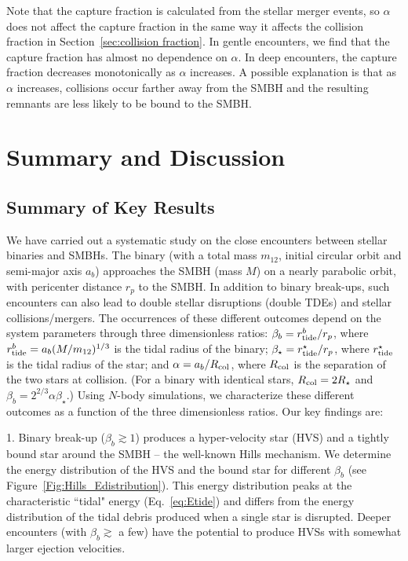 \documentclass[twocolumn]{aastex631}
\begin{document}
Note that the capture fraction is calculated from the stellar merger events, so $\alpha$ does not affect the capture fraction in the same way it affects the collision fraction in Section~\ref{sec:collision fraction}. 
In gentle encounters, we find that the capture fraction has almost no dependence on $\alpha$. 
In deep encounters, the capture fraction decreases monotonically as $\alpha$ increases. 
A possible explanation is that as $\alpha$ increases, collisions occur farther away from the SMBH and the resulting remnants are less likely to be bound to the SMBH. 


\section{Summary and Discussion}
\label{sec:application and summary}


\subsection{Summary of Key Results}
\label{sec:summary}

We have carried out a systematic study on the close encounters between stellar binaries and SMBHs. 
The binary (with a total mass $m_{12}$, initial circular orbit and semi-major axis $a_b$) approaches the SMBH (mass $M$) on a nearly parabolic orbit, with pericenter distance $r_p$ to the SMBH. 
In addition to binary break-ups, such encounters can also lead to double stellar disruptions (double TDEs) and stellar collisions/mergers. 
The occurrences of these different outcomes depend on the system parameters through three dimensionless ratios:
$\beta_b=r_{\rm tide}^b/r_p$, where $r_{\rm tide}^b=a_b(M/m_{12})^{1/3}$ is the tidal radius of the binary; 
$\beta_\star=r_{\rm tide}^\star/r_p$, where $r_{\rm tide}^\star$ is the tidal radius of the star; 
and $\alpha=a_b/R_{\rm col}$, where $R_{\rm col}$ is the separation of the two stars at collision.
(For a binary with identical stars, $R_{\rm col}=2R_\star$ and $\beta_b=2^{2/3}\alpha \beta_\star$.)
Using $N$-body simulations, we characterize these different outcomes as a function of the three dimensionless ratios. 
Our key findings are:

1. Binary break-up ($\beta_b\gtrsim 1$) produces a hyper-velocity star (HVS) and a tightly bound star around the SMBH -- the well-known Hills mechanism. 
We determine the energy distribution of the HVS and the bound star for different $\beta_b$ (see Figure~\ref{Fig:Hills_Edistribution}). 
This energy distribution peaks at the characteristic ``tidal" energy (Eq.~\ref{eq:Etide}) and differs from the energy distribution of the tidal debris produced when a single star is disrupted. 
Deeper encounters (with $\beta_b\gtrsim$ a few) have the potential to produce HVSs with somewhat larger ejection velocities.
\end{document}
